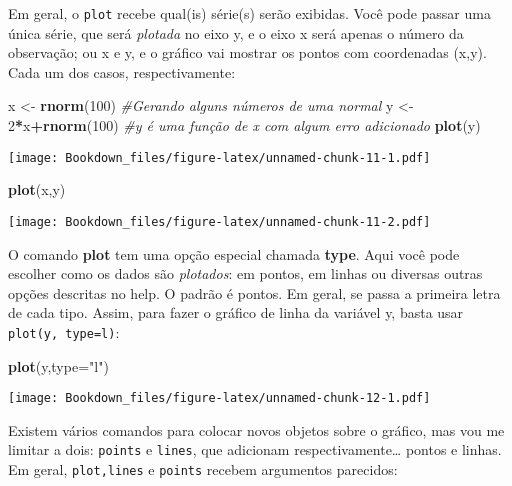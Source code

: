 \documentclass[]{book}
\newenvironment{Shaded}{\begin{snugshade}}{\end{snugshade}}
\newcommand{\KeywordTok}[1]{\textcolor[rgb]{0.13,0.29,0.53}{\textbf{#1}}}
\newcommand{\DataTypeTok}[1]{\textcolor[rgb]{0.13,0.29,0.53}{#1}}
\newcommand{\DecValTok}[1]{\textcolor[rgb]{0.00,0.00,0.81}{#1}}
\newcommand{\StringTok}[1]{\textcolor[rgb]{0.31,0.60,0.02}{#1}}
\newcommand{\CommentTok}[1]{\textcolor[rgb]{0.56,0.35,0.01}{\textit{#1}}}
\newcommand{\OperatorTok}[1]{\textcolor[rgb]{0.81,0.36,0.00}{\textbf{#1}}}
\newcommand{\NormalTok}[1]{#1}
\begin{document}
Em geral, o \texttt{plot} recebe qual(is) série(s) serão exibidas. Você
pode passar uma única série, que será \emph{plotada} no eixo y, e o eixo
x será apenas o número da observação; ou x e y, e o gráfico vai mostrar
os pontos com coordenadas (x,y). Cada um dos casos, respectivamente:

\begin{Shaded}
\begin{Highlighting}[]
\NormalTok{x <-}\StringTok{ }\KeywordTok{rnorm}\NormalTok{(}\DecValTok{100}\NormalTok{) }\CommentTok{#Gerando alguns números de uma normal}
\NormalTok{y <-}\StringTok{ }\DecValTok{2}\OperatorTok{*}\NormalTok{x}\OperatorTok{+}\KeywordTok{rnorm}\NormalTok{(}\DecValTok{100}\NormalTok{) }\CommentTok{#y é uma função de x com algum erro adicionado}
\KeywordTok{plot}\NormalTok{(y)}
\end{Highlighting}
\end{Shaded}

\texttt{[image: Bookdown\_files/figure-latex/unnamed-chunk-11-1.pdf]}

\begin{Shaded}
\begin{Highlighting}[]
\KeywordTok{plot}\NormalTok{(x,y)}
\end{Highlighting}
\end{Shaded}

\texttt{[image: Bookdown\_files/figure-latex/unnamed-chunk-11-2.pdf]}

O comando \textbf{plot} tem uma opção especial chamada \textbf{type}.
Aqui você pode escolher como os dados são \emph{plotados}: em pontos, em
linhas ou diversas outras opções descritas no help. O padrão é pontos.
Em geral, se passa a primeira letra de cada tipo. Assim, para fazer o
gráfico de linha da variável y, basta usar
\texttt{plot(y,\ type=\textquotesingle{}\textquotesingle{}l\textquotesingle{}\textquotesingle{})}:

\begin{Shaded}
\begin{Highlighting}[]
\KeywordTok{plot}\NormalTok{(y,}\DataTypeTok{type=}\StringTok{"l"}\NormalTok{)}
\end{Highlighting}
\end{Shaded}

\texttt{[image: Bookdown\_files/figure-latex/unnamed-chunk-12-1.pdf]}

Existem vários comandos para colocar novos objetos sobre o gráfico, mas
vou me limitar a dois: \texttt{points} e \texttt{lines}, que adicionam
respectivamente\ldots{} pontos e linhas. Em geral, \texttt{plot,lines} e
\texttt{points} recebem argumentos parecidos:
\end{document}
